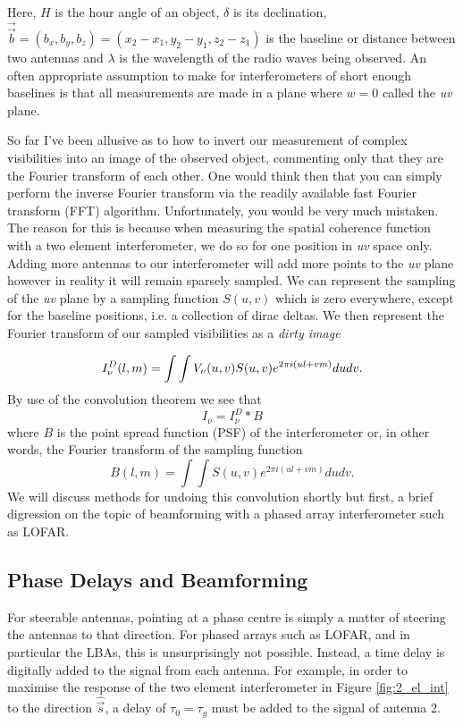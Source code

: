 Here, $H$ is the hour angle of an object, $\delta$ is its declination, $\overrightarrow{\Vec{b}} = (b_x, b_y, b_z)=(x_2-x_1,y_2-y_1,z_2-z_1)$ is the baseline or distance between two antennas and $\lambda$ is the wavelength of the radio waves being observed. An often appropriate assumption to make for interferometers of short enough baselines is that all measurements are made in a plane where $w = 0$ called the \textit{uv} plane.

So far I've been allusive as to how to invert our measurement of complex visibilities into an image of the observed object, commenting only that they are the Fourier transform of each other. One would think then that you can simply perform the inverse Fourier transform via the readily available fast Fourier transform (FFT) algorithm. Unfortunately, you would be very much mistaken. The reason for this is because when measuring the spatial coherence function with a two element interferometer, we do so for one position in \textit{uv} space only. Adding more antennas to our interferometer will add more points to the \textit{uv} plane however in reality it will remain sparsely sampled. We can represent the sampling of the \textit{uv} plane by a sampling function $S(u,v)$ which is zero everywhere, except for the baseline positions, i.e. a collection of dirac deltas. We then represent the Fourier transform of our sampled visibilities as a \textit{dirty image}

\begin{equation}
\label{eq:int_dirtyimage}
I_\nu^D(l, m) = \int \int V_\nu (u,v) S(u,v)e^{2 \pi i (ul + vm)} du dv.\\
\end{equation} 
By use of the convolution theorem we see that 
\begin{equation}
\label{eq:int_convolution}
I_\nu = I_\nu^D \ast B
\end{equation}
where $B$ is the point spread function (PSF) of the interferometer or, in other words, the Fourier transform of the sampling function
\begin{equation}
\label{eq:int_psf}
B(l,m) = \int \int S(u,v) e^{2 \pi i(ul+vm)} du dv.
\end{equation}
We will discuss methods for undoing this convolution shortly but first, a brief digression on the topic of beamforming with a phased array interferometer such as LOFAR.

\subsection{Phase Delays and Beamforming}
\label{sec:beamform_theory}
For steerable antennas, pointing at a phase centre is simply a matter of steering the antennas to that direction. For phased arrays such as LOFAR, and in particular the LBAs, this is unsurprisingly not possible. Instead, a time delay is digitally added to the signal from each antenna. For example, in order to maximise the response of the two element interferometer in Figure \ref{fig:2_el_int} to the direction $\hat{\Vec{s}}$, a delay of $\tau_0 = \tau_g$ must be added to the signal of antenna 2. 

